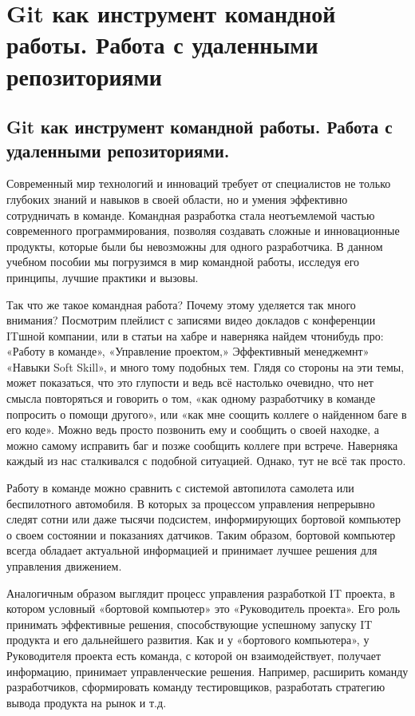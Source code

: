\documentclass[letterpaper,10pt,russian]{sphinxmanual}
\begin{document}
\chapter{Git как инструмент командной работы. Работа с удаленными репозиториями}
\label{\detokenize{index:id4}}
\sphinxstepscope


\section{Git как инструмент командной работы. Работа с удаленными репозиториями.}
\label{\detokenize{educational_materials/team_work_on_a_project/content:git}}\label{\detokenize{educational_materials/team_work_on_a_project/content::doc}}
\sphinxAtStartPar
Современный мир технологий и инноваций требует от специалистов не только глубоких знаний и навыков в своей области, но и умения эффективно сотрудничать в команде. Командная разработка стала неотъемлемой частью современного программирования, позволяя создавать сложные и инновационные продукты, которые были бы невозможны для одного разработчика. В данном учебном пособии мы погрузимся в мир командной работы, исследуя его принципы, лучшие практики и вызовы.

\sphinxAtStartPar
Так что же такое командная работа? Почему этому уделяется так много внимания? Посмотрим плейлист с записями видео докладов с конференции IT\sphinxhyphen{}шной компании, или в статьи на хабре и наверняка найдем что\sphinxhyphen{}нибудь про: «Работу в команде», «Управление проектом,» Эффективный менеджемнт» «Навыки Soft Skill», и много тому подобных тем. Глядя со стороны на эти темы, может показаться, что это глупости и ведь всё настолько очевидно, что нет смысла повторяться и говорить о том, «как одному разработчику в команде попросить о помощи другого», или «как мне соощить коллеге о найденном баге в его коде». Можно ведь просто позвонить ему и сообщить о своей находке, а можно самому исправить баг и позже сообщить коллеге при встрече. Наверняка каждый из нас сталкивался с подобной ситуацией. Однако, тут не всё так просто.

\sphinxAtStartPar
Работу в команде можно сравнить с системой автопилота самолета или беспилотного автомобиля. В которых за процессом управления непрерывно следят сотни или даже тысячи подсистем, информирующих бортовой компьютер о своем состоянии и показаниях датчиков. Таким образом, бортовой компьютер всегда обладает актуальной информацией и принимает лучшее решения для управления движением.

\sphinxAtStartPar
Аналогичным образом выглядит процесс управления разработкой IT проекта, в котором условный «бортовой компьютер» это «Руководитель проекта». Его роль \sphinxhyphen{} принимать эффективные решения, способствующие успешному запуску IT продукта и его дальнейшего развития. Как и у «бортового компьютера», у Руководителя проекта есть команда, с которой он взаимодействует, получает информацию, принимает управленческие решения. Например, расширить команду разработчиков, сформировать команду тестировщиков, разработать стратегию вывода продукта на рынок и т.д.
\end{document}
